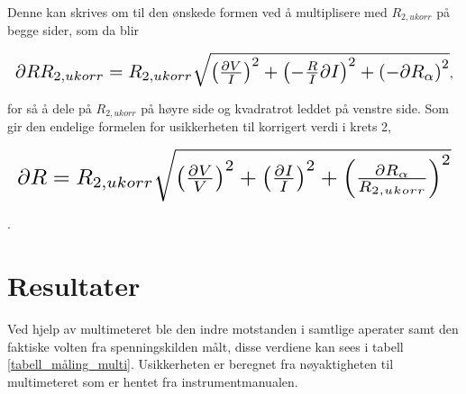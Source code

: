 \documentclass[twocolumn, a4paper, 11pt]{article} %
\begin{document}
Denne kan skrives om til den ønskede formen ved å multiplisere med $R_{2,ukorr}$ på begge sider, som da blir


\begin{equation}
\resizebox{1.0\hsize}{!}{$
    \partial R R_{2,ukorr} = R_{2,ukorr} \sqrt{{\left(\frac{\partial V}{I}\right)}^2 + {\left(-\frac{R}{I} \partial I\right)}^2 + {\left(-\partial R_\alpha \right)}^2}
    $},
\label{Formula_R_2_ukorr}
\end{equation}

for så å dele på $R_{2,ukorr}$ på høyre side og kvadratrot leddet på venstre side. Som gir den endelige formelen for usikkerheten til korrigert verdi i krets 2, 


\begin{equation}
\resizebox{1.0\hsize}{!}{$
    \partial R = R_{2,ukorr} \sqrt{{\left(\frac{\partial V}{V}\right)}^2 + {\left(\frac{\partial I}{I}\right)}^2 + {\left(\frac{\partial R_\alpha}{R_{2,ukorr}} \right)}^2}
    $}
\label{formel_krets2_delta_R_korr}
\end{equation}

\cite{oppgavetekst}.
\section{Resultater}

Ved hjelp av multimeteret ble den indre motstanden i samtlige aperater samt den faktiske volten fra spenningskilden målt, disse verdiene kan sees i tabell \ref{tabell_måling_multi}. Usikkerheten er beregnet fra nøyaktigheten til multimeteret som er hentet fra instrumentmanualen. 


\begin{table}[H]
\centering
\caption{Teoretiske verdier mot målte verdier fra multimeteret}
\label{tabell_måling_multi}
\end{table}
\end{document}
